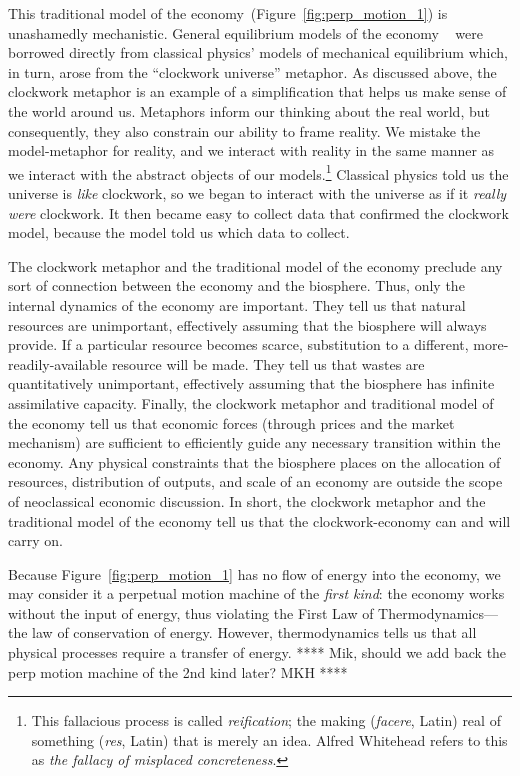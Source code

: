 This traditional model of the economy~(Figure~\ref{fig:perp_motion_1}) 
is unashamedly mechanistic.
General equilibrium models of the economy
~\cite{Walras1892, Walras1993}
were borrowed directly from classical physics' models of 
mechanical equilibrium which, in turn, arose from the 
``clockwork universe'' metaphor.\cite{Ingrao1990}
As discussed above, 
the clockwork metaphor is an example  
of a simplification that helps us make sense of the world around us.
Metaphors inform our thinking about the real world,
but consequently,
they also constrain our ability to frame reality.
We mistake the model-metaphor for reality, and
we interact with reality in the same manner 
as we interact with the abstract objects of our
models.\footnote{This fallacious process is called
	\emph{reification}; the making (\emph{facere}, Latin) real of
	something (\emph{res}, Latin) that is merely an idea.
	Alfred Whitehead refers to this as
	\emph{the fallacy of misplaced concreteness}.\cite{Whitehead2011}
	}
Classical physics told us the universe is
\emph{like} clockwork, 
so we began to interact with the universe
as if it \emph{really were} clockwork.
It then became easy to collect data that confirmed the clockwork model,
because the model told us which data to collect.

The clockwork metaphor and the traditional model of the economy
preclude any sort of connection 
between the economy and the biosphere.
Thus, only the internal dynamics of the economy are important. 
They tell us that natural resources are unimportant, 
effectively assuming that the biosphere will always provide.
If a particular resource becomes scarce, 
substitution to a different, more-readily-available resource will be made.
They tell us that wastes are quantitatively unimportant, 
effectively assuming that the biosphere has infinite assimilative capacity.
Finally, the clockwork metaphor and traditional model of the economy 
tell us that economic forces 
(through prices and the market mechanism) 
are sufficient to efficiently guide any necessary transition
within the economy.
Any physical constraints that the biosphere places on 
the allocation of resources, distribution of outputs, and 
scale of an economy 
are outside the scope of neoclassical economic discussion.\cite{Daly1995}
In short, the clockwork metaphor and the traditional model of the economy 
tell us that the clockwork-economy can and will carry on.

Because Figure~\ref{fig:perp_motion_1} has no flow of energy
into the economy,
we may consider it a perpetual motion machine
of the \emph{first kind}:
the economy works without the input of energy, thus violating
the First Law of Thermodynamics---the 
law of conservation of energy.\cite{Rao2004}
However, thermodynamics tells us that all physical processes 
require a transfer of energy.
**** Mik, should we add back the perp motion machine of the 2nd kind later? MKH ****


